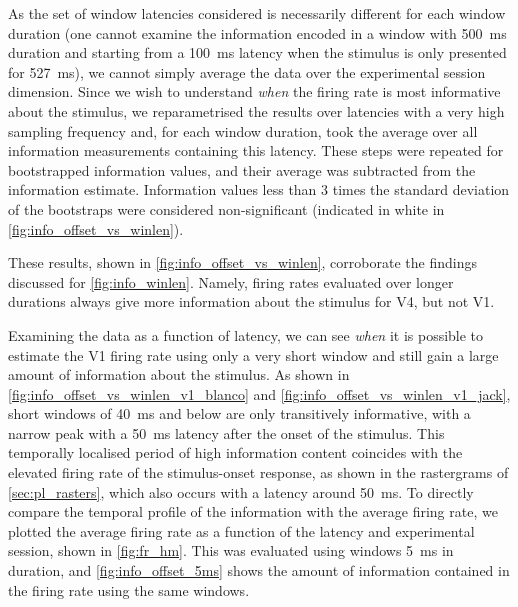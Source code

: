 As the set of window latencies considered is necessarily different for each window duration (one cannot examine the information encoded in a window with \SI{500}{\milli\second} duration and starting from a \SI{100}{\milli\second} latency when the stimulus is only presented for \SI{527}{\milli\second}), we cannot simply average the data over the experimental session dimension.
Since we wish to understand \textit{when} the firing rate is most informative about the stimulus, we reparametrised the results over latencies with a very high sampling frequency and, for each window duration, took the average over all information measurements containing this latency.
These steps were repeated for bootstrapped information values, and their average was subtracted from the information estimate.
Information values less than \num{3} times the standard deviation of the bootstraps were considered non-significant (indicated in white in \autoref{fig:info_offset_vs_winlen}).

These results, shown in \autoref{fig:info_offset_vs_winlen}, corroborate the findings discussed for \autoref{fig:info_winlen}.
Namely, firing rates evaluated over longer durations always give more information about the stimulus for \ac{V4}, but not \ac{V1}.

Examining the data as a function of latency, we can see \textit{when} it is possible to estimate the \ac{V1} firing rate using only a very short window and still gain a large amount of information about the stimulus.
As shown in \autoref{fig:info_offset_vs_winlen_v1_blanco} and \autoref{fig:info_offset_vs_winlen_v1_jack}, short windows of \SI{40}{\milli\second} and below are only transitively informative, with a narrow peak with a \SI{50}{\milli\second} latency after the onset of the stimulus.
This temporally localised period of high information content coincides with the elevated firing rate of the stimulus-onset response, as shown in the rastergrams of \autoref{sec:pl_rasters}, which also occurs with a latency around \SI{50}{\milli\second}.
To directly compare the temporal profile of the information with the average firing rate, we plotted the average firing rate as a function of the latency and experimental session, shown in \autoref{fig:fr_hm}.
This was evaluated using windows \SI{5}{\milli\second} in duration, and \autoref{fig:info_offset_5ms} shows the amount of information contained in the firing rate using the same windows.


